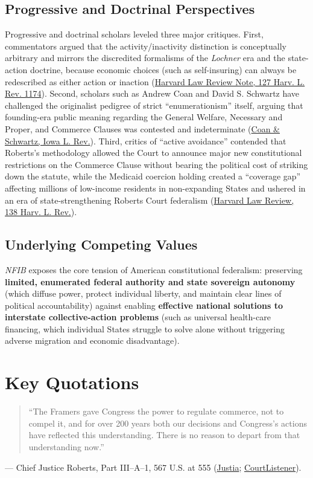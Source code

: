 \documentclass[12pt]{article}
\begin{document}
\subsection{Progressive and Doctrinal Perspectives}
Progressive and doctrinal scholars leveled three major critiques. First, commentators argued that the activity/inactivity distinction is conceptually arbitrary and mirrors the discredited formalisms of the \textit{Lochner} era and the state-action doctrine, because economic choices (such as self-insuring) can always be redescribed as either action or inaction (\href{https://harvardlawreview.org/wp-content/uploads/2014/02/vol127_nfib_v_sebelius.pdf}{Harvard Law Review Note, 127 Harv. L. Rev. 1174}). Second, scholars such as Andrew Coan and David S. Schwartz have challenged the originalist pedigree of strict ``enumerationism'' itself, arguing that founding-era public meaning regarding the General Welfare, Necessary and Proper, and Commerce Clauses was contested and indeterminate (\href{https://ilr.law.uiowa.edu/sites/ilr.law.uiowa.edu/files/2024-03/ILR-109-Coan-Schwartz_0.pdf}{Coan \& Schwartz, Iowa L. Rev.}). Third, critics of ``active avoidance'' contended that Roberts's methodology allowed the Court to announce major new constitutional restrictions on the Commerce Clause without bearing the political cost of striking down the statute, while the Medicaid coercion holding created a ``coverage gap'' affecting millions of low-income residents in non-expanding States and ushered in an era of state-strengthening Roberts Court federalism (\href{https://harvardlawreview.org/print/vol-138/federalism-rebalancing-and-the-roberts-court-a-departure-from-historical-patterns/}{Harvard Law Review, 138 Harv. L. Rev.}).

\subsection{Underlying Competing Values}
\textit{NFIB} exposes the core tension of American constitutional federalism: preserving \textbf{limited, enumerated federal authority and state sovereign autonomy} (which diffuse power, protect individual liberty, and maintain clear lines of political accountability) against enabling \textbf{effective national solutions to interstate collective-action problems} (such as universal health-care financing, which individual States struggle to solve alone without triggering adverse migration and economic disadvantage).

\section{Key Quotations}
\begin{quote}
``The Framers gave Congress the power to regulate commerce, not to compel it, and for over 200 years both our decisions and Congress's actions have reflected this understanding. There is no reason to depart from that understanding now.''
\end{quote}
\noindent --- Chief Justice Roberts, Part III--A--1, 567 U.S. at 555 (\href{https://supreme.justia.com/cases/federal/us/567/519/}{Justia}; \href{https://www.courtlistener.com/opinion/809122/national-federation-of-independent-business-v-sebelius/}{CourtListener}).
\end{document}
